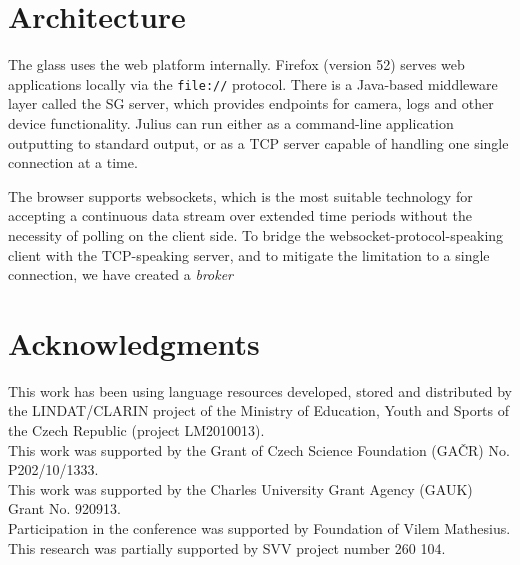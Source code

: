 \documentclass{llncs}
\begin{document}
\section{Architecture}

The glass uses the web platform internally. Firefox (version 52) serves web applications
locally via the \texttt{file://} protocol. There is a Java-based middleware
layer called the SG server, which provides endpoints for camera, logs and other
device functionality. Julius can run either as a command-line application
outputting to standard output, or as a TCP server capable of handling one single
connection at a time.

The browser supports websockets, which is the most suitable technology for
accepting a continuous data stream over extended time periods without the
necessity of polling on the client side. To bridge the
websocket-protocol-speaking client with the TCP-speaking server, and to mitigate
the limitation to a single connection, we have created a {\em broker}

\section*{Acknowledgments}

This work has been using language resources developed, stored and distributed by the LINDAT/CLARIN project of the Ministry of Education, Youth and Sports of the Czech Republic (project LM2010013).
\\
This work was supported by the Grant of Czech Science Foundation (GA\v{C}R) No. P202/10/1333.
\\
This work was supported by the Charles University Grant Agency (GAUK) Grant No. 920913.
\\
Participation in the conference was supported by Foundation of Vilem Mathesius.
\\
This research was partially supported by SVV project number 260 104.




\end{document}
